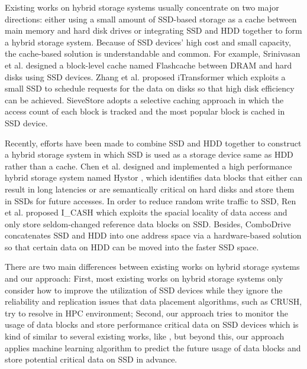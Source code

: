 Existing works on hybrid storage systems usually concentrate on two major
directions: either using a small amount of SSD-based storage as a cache
between main memory and hard disk drives or integrating SSD and HDD together
to form a hybrid storage system. Because of SSD devices' high cost and small
capacity, the cache-based solution is understandable and common. For example,
Srinivasan et al. designed a block-level cache named Flashcache
\cite{Flashcache} between DRAM and hard disks using SSD devices. Zhang et al.
proposed iTransformer \cite{Zhang2012} which exploits a small SSD to schedule
requests for the data on disks so that high disk efficiency can be achieved.
SieveStore \cite{Pritchett2010} adopts a selective caching approach in which
the access count of each block is tracked and the most popular block is cached
in SSD device.

Recently, efforts have been made to combine SSD and HDD together to construct
a hybrid storage system in which SSD is used as a storage device same as HDD
rather than a cache. Chen et al. designed and implemented a high performance
hybrid storage system named Hystor \cite{Chen2011}, which identifies data
blocks that either can result in long latencies or are semantically critical
on hard disks and store them in SSDs for future accesses. In order to reduce
random write traffic to SSD, Ren et al. proposed I\_CASH \cite{Yang2011} which
exploits the spacial locality of data access and only store seldom-changed
reference data blocks on SSD. Besides, ComboDrive \cite{Payer2009}
concatenates SSD and HDD into one address space via a hardware-based solution
so that certain data on HDD can be moved into the faster SSD space.

There are two main differences between existing works on hybrid storage
systems and our approach: First, most existing works on hybrid storage systems
only consider how to improve the utilization of SSD devices while they ignore
the reliability and replication issues that data placement algorithms, such as
CRUSH, try to resolve in HPC environment; Second, our approach tries to
monitor the usage of data blocks and store performance critical data on SSD
devices which is kind of similar to several existing works, like
\cite{Chen2011, Luo2012}, but beyond this, our approach applies machine
learning algorithm to predict the future usage of data blocks and store
potential critical data on SSD in advance.

